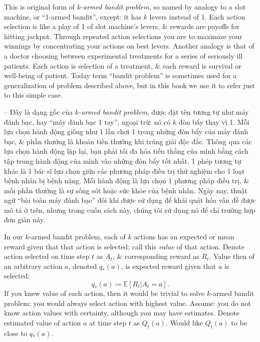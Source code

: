 \documentclass{article}
\begin{document}
\begin{itemize}
\begin{itemize}
        This is original form of {\it$k$-armed bandit problem}, so named by analogy to a slot machine, or ``1-armed bandit'', except: it has $k$ levers instead of 1. Each action selection is like a play of 1 of slot machine's levers, \& rewards are payoffs for hitting jackpot. Through repeated action selections you are to maximize your winnings by concentrating your actions on best levers. Another analogy is that of a doctor choosing between experimental treatments for a series of seriously ill patients. Each action is selection of a treatment, \& each reward is survival or well-being of patient. Today term ``bandit problem'' is sometimes used for a generalization of problem described above, but in this book we use it to refer just to this simple case.

        -- Đây là dạng gốc của {\it$k$-armed bandit problem}, được đặt tên tương tự như máy đánh bạc, hay ``máy đánh bạc 1 tay'', ngoại trừ: nó có $k$ đòn bẩy thay vì 1. Mỗi lựa chọn hành động giống như 1 lần chơi 1 trong những đòn bẩy của máy đánh bạc, \& phần thưởng là khoản tiền thưởng khi trúng giải độc đắc. Thông qua các lựa chọn hành động lặp lại, bạn phải tối đa hóa tiền thắng của mình bằng cách tập trung hành động của mình vào những đòn bẩy tốt nhất. 1 phép tương tự khác là 1 bác sĩ lựa chọn giữa các phương pháp điều trị thử nghiệm cho 1 loạt bệnh nhân bị bệnh nặng. Mỗi hành động là lựa chọn 1 phương pháp điều trị, \& mỗi phần thưởng là sự sống sót hoặc sức khỏe của bệnh nhân. Ngày nay, thuật ngữ ``bài toán máy đánh bạc'' đôi khi được sử dụng để khái quát hóa vấn đề được mô tả ở trên, nhưng trong cuốn sách này, chúng tôi sử dụng nó để chỉ trường hợp đơn giản này.

        In our $k$-armed bandit problem, each of $k$ actions has an expected or mean reward given that that action is selected; call this {\it value} of that action. Denote action selected on time step $t$ as $A_t$, \& corresponding reward as $R_t$. Value then of an arbitrary action $a$, denoted $q_*(a)$, is expected reward given that $a$ is selected:
        \begin{equation*}
            q_*(a)\coloneqq\mathbb{E}[R_t|A_t = a].
        \end{equation*}
        If you knew value of each action, then it would be trivial to solve $k$-armed bandit problem: you would always select action with highest value. Assume: you do not know action values with certainty, although you may have estimates. Denote estimated value of action $a$ at time step $t$ as $Q_t(a)$. Would like $Q_t(a)$ to be close to $q_*(a)$.


\end{itemize}
\end{itemize}
\end{document}

